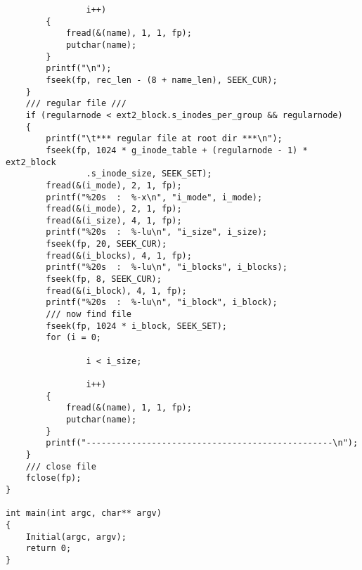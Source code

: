 \documentclass[UTF8]{ctexart}
\begin{document}
\begin{verbatim}
                i++)
        {
            fread(&(name), 1, 1, fp);
            putchar(name);
        }
        printf("\n");
        fseek(fp, rec_len - (8 + name_len), SEEK_CUR);
    }
    /// regular file ///
    if (regularnode < ext2_block.s_inodes_per_group && regularnode)
    {
        printf("\t*** regular file at root dir ***\n");
        fseek(fp, 1024 * g_inode_table + (regularnode - 1) * ext2_block
                .s_inode_size, SEEK_SET);
        fread(&(i_mode), 2, 1, fp);
        printf("%20s  :  %-x\n", "i_mode", i_mode);
        fread(&(i_mode), 2, 1, fp);
        fread(&(i_size), 4, 1, fp);
        printf("%20s  :  %-lu\n", "i_size", i_size);
        fseek(fp, 20, SEEK_CUR);
        fread(&(i_blocks), 4, 1, fp);
        printf("%20s  :  %-lu\n", "i_blocks", i_blocks);
        fseek(fp, 8, SEEK_CUR);
        fread(&(i_block), 4, 1, fp);
        printf("%20s  :  %-lu\n", "i_block", i_block);
        /// now find file
        fseek(fp, 1024 * i_block, SEEK_SET);
        for (i = 0;

                i < i_size;

                i++)
        {
            fread(&(name), 1, 1, fp);
            putchar(name);
        }
        printf("-------------------------------------------------\n");
    }
    /// close file
    fclose(fp);
}

int main(int argc, char** argv)
{
    Initial(argc, argv);
    return 0;
}


\end{verbatim}
\end{document}
